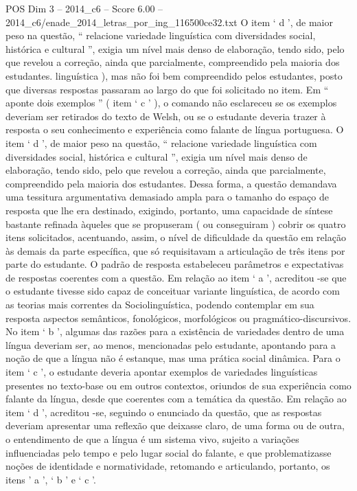 \begin{textsample}{POS Dim 3 – 2014\_c6 – Score 6.00 – 2014\_c6/enade\_2014\_letras\_por\_ing\_116500ce32.txt}
O item ‘ d ’, de maior peso na questão, “ relacione variedade linguística com diversidades social, histórica e cultural ”, exigia um nível mais denso de elaboração, tendo sido, pelo que revelou a correção, ainda que parcialmente, compreendido pela maioria dos estudantes. linguística ), mas não foi bem compreendido pelos estudantes, posto que diversas respostas passaram ao largo do que foi solicitado no item.
Em “ aponte dois exemplos ” ( item ‘ c ’ ), o comando não esclareceu se os exemplos deveriam ser retirados do texto de Welsh, ou se o estudante deveria trazer à resposta o seu conhecimento e experiência como falante de língua portuguesa.
O item ‘ d ’, de maior peso na questão, “ relacione variedade linguística com diversidades social, histórica e cultural ”, exigia um nível mais denso de elaboração, tendo sido, pelo que revelou a correção, ainda que parcialmente, compreendido pela maioria dos estudantes.
Dessa forma, a questão demandava uma tessitura argumentativa demasiado ampla para o tamanho do espaço de resposta que lhe era destinado, exigindo, portanto, uma capacidade de síntese bastante refinada àqueles que se propuseram ( ou conseguiram ) cobrir os quatro itens solicitados, acentuando, assim, o nível de dificuldade da questão em relação às demais da parte específica, que só requisitavam a articulação de três itens por parte do estudante.
O padrão de resposta estabeleceu parâmetros e expectativas de respostas coerentes com a questão.
Em relação ao item ‘ a ’, acreditou -se que o estudante tivesse sido capaz de conceituar variante linguística, de acordo com as teorias mais correntes da Sociolinguística, podendo contemplar em sua resposta aspectos semânticos, fonológicos, morfológicos ou pragmático-discursivos.
No item ‘ b ’, algumas das razões para a existência de variedades dentro de uma língua deveriam ser, ao menos, mencionadas pelo estudante, apontando para a noção de que a língua não é estanque, mas uma prática social dinâmica.
Para o item ‘ c ’, o estudante deveria apontar exemplos de variedades linguísticas presentes no texto-base ou em outros contextos, oriundos de sua experiência como falante da língua, desde que coerentes com a temática da questão.
Em relação ao item ‘ d ’, acreditou -se, seguindo o enunciado da questão, que as respostas deveriam apresentar uma reflexão que deixasse claro, de uma forma ou de outra, o entendimento de que a língua é um sistema vivo, sujeito a variações influenciadas pelo tempo e pelo lugar social do falante, e que problematizasse noções de identidade e normatividade, retomando e articulando, portanto, os itens ’ a ’, ‘ b ’ e ‘ c ’.

\end{textsample}
